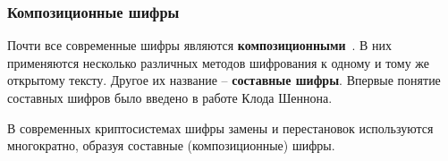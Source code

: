 \subsubsection{Композиционные шифры}

Почти все современные шифры являются \textbf{композиционными}~\cite{AlZKCh:2001}. В них применяются несколько различных методов шифрования к одному и тому же открытому тексту. Другое их название -- \textbf{составные шифры}. Впервые понятие составных шифров было введено в работе Клода Шеннона.

В современных криптосистемах шифры замены и перестановок используются многократно, образуя составные (композиционные) шифры.

